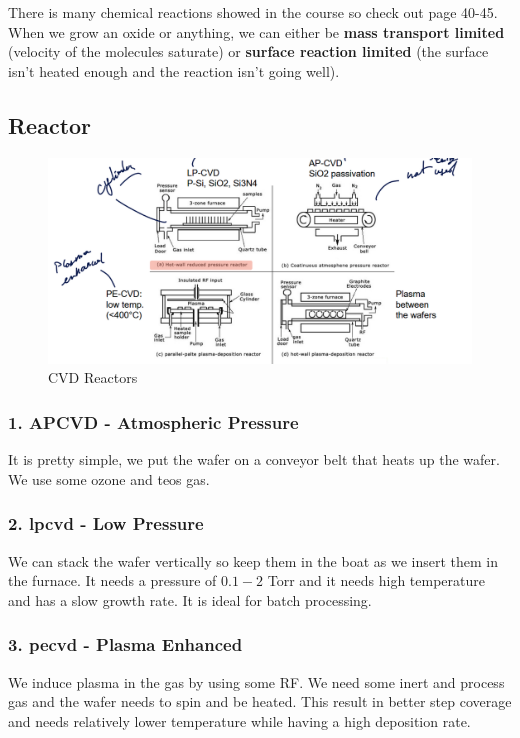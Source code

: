 \documentclass{report}
\begin{document}
There is many chemical reactions showed in the course so check out page 40-45. When we grow an oxide or anything, we can either be \textbf{mass transport limited} (velocity of the molecules saturate) or \textbf{surface reaction limited} (the surface isn't heated enough and the reaction isn't going well).

\subsection{Reactor}

\begin{figure}[H]
    \centering
    \includegraphics[width=0.85\linewidth]{reactor.png}
    \caption{CVD Reactors}
    \label{fig:cvd-reactors-label}
\end{figure}

\subsubsection{1. APCVD - Atmospheric Pressure}

It is pretty simple, we put the wafer on a conveyor belt that heats up the wafer. We use some ozone and \gls{teos} gas.

\subsubsection{2. \gls{lpcvd} - Low Pressure}

We can stack the wafer vertically so keep them in the boat as we insert them in the furnace. It needs a pressure of $0.1-2$ Torr and it needs high temperature and has a slow growth rate. It is ideal for batch processing.

\subsubsection{3. \gls{pecvd} - Plasma Enhanced}

We induce plasma in the gas by using some RF. We need some inert and process gas and the wafer needs to spin and be heated. This result in better step coverage and needs relatively lower temperature while having a high deposition rate.
\end{document}
